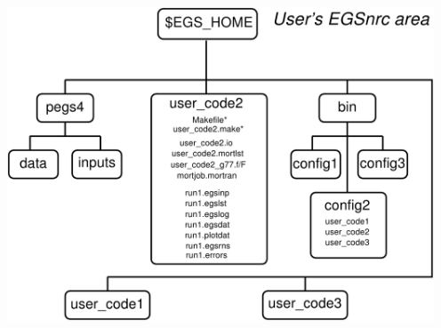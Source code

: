 \documentclass[12pt,twoside]{article}
\begin{document}
\begin{center}
\includegraphics[width=5in]{figures/Users_EGSnrc_area}
\end{center}



% 
% 
\end{document}
